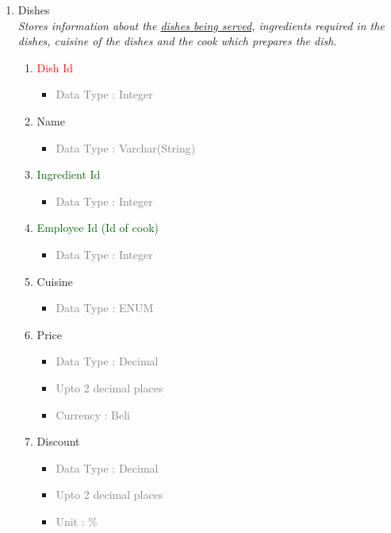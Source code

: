 \begin{enumerate}
        \item Dishes \\
        \textit{Stores information about the \underline{dishes being served}, ingredients required in the dishes, cuisine of the dishes and the cook which prepares the dish.}
            \begin{enumerate}[label=\alph*.]
                \item\textcolor{red}{Dish Id}
                    \begin{itemize}[label=-]
                        \item \textcolor{gray}{Data Type : Integer}
                    \end{itemize}
                \item Name
                    \begin{itemize}[label=-]
                        \item \textcolor{gray}{Data Type : Varchar(String)}
                    \end{itemize}
                \item \textcolor{darkgreen}{Ingredient Id}
                    \begin{itemize}[label=-]
                        \item \textcolor{gray}{Data Type : Integer}
                    \end{itemize}
                \item \textcolor{darkgreen}{Employee Id (Id of cook)}
                    \begin{itemize}[label=-]
                        \item \textcolor{gray}{Data Type : Integer}
                    \end{itemize}
                \item Cuisine
                    \begin{itemize}[label=-]
                        \item \textcolor{gray}{Data Type : ENUM}
                    \end{itemize}
                \item Price
                    \begin{itemize}[label=-]
                        \item \textcolor{gray}{Data Type : Decimal}
                        \item \textcolor{gray}{Upto 2 decimal places}
                        \item \textcolor{gray}{Currency : Beli}
                    \end{itemize}
                \item Discount
                    \begin{itemize}[label=-]
                        \item \textcolor{gray}{Data Type : Decimal}
                        \item \textcolor{gray}{Upto 2 decimal places}
                        \item \textcolor{gray}{Unit : \%}
                    \end{itemize}
            \end{enumerate}


\end{enumerate}

